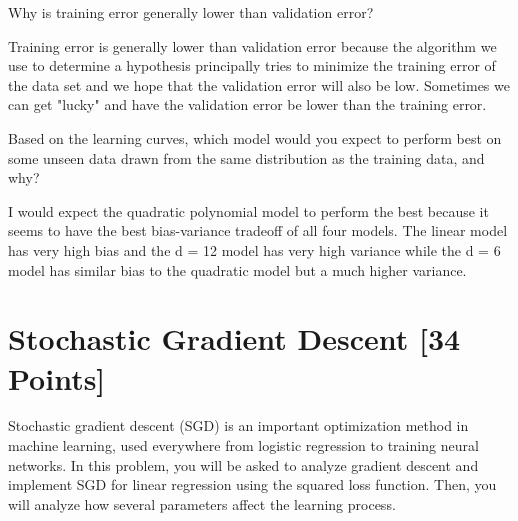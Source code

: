 \begin{problem}[3]
  Why is training error generally lower than validation error?
\end{problem}
\begin{solution}
  Training error is generally lower than validation error because the algorithm we use
  to determine a hypothesis principally tries to minimize the training error of the
  data set and we hope that the validation error will also be low. Sometimes we can
  get "lucky" and have the validation error be lower than the training error.
\end{solution}

\begin{problem}[3]
  Based on the learning curves, which model would you expect to perform best on some unseen data drawn from the same distribution as the training data, and why?
\end{problem}
\begin{solution}
  I would expect the quadratic polynomial model to perform the best because it seems to
  have the best bias-variance tradeoff of all four models. The linear model has very
  high bias and the d = 12 model has very high variance while the d = 6 model has 
  similar bias to the quadratic model but a much higher variance.
\end{solution}





\newpage
\section{Stochastic Gradient Descent [34 Points]}

Stochastic gradient descent (SGD) is an important optimization method in machine learning, used everywhere from logistic regression to training neural networks. In this problem, you will be asked to analyze gradient descent and implement SGD for linear regression using the squared loss function. Then, you will analyze how several parameters affect the learning process.

